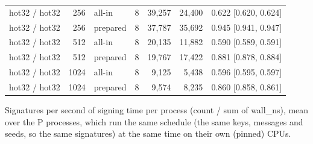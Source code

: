 \begin{table}[t]
{\begin{tabular}{lrlrrrl}
hot32 / hot32 & 256 & all-in & 8 & 39{,}257 & 24{,}400 & 0.622 [0.620, 0.624] \\
hot32 / hot32 & 256 & prepared & 8 & 37{,}787 & 35{,}692 & 0.945 [0.941, 0.947] \\
hot32 / hot32 & 512 & all-in & 8 & 20{,}135 & 11{,}882 & 0.590 [0.589, 0.591] \\
hot32 / hot32 & 512 & prepared & 8 & 19{,}767 & 17{,}422 & 0.881 [0.878, 0.884] \\
hot32 / hot32 & 1024 & all-in & 8 & 9{,}125 & 5{,}438 & 0.596 [0.595, 0.597] \\
hot32 / hot32 & 1024 & prepared & 8 & 9{,}574 & 8{,}235 & 0.860 [0.858, 0.861] \\
\bottomrule
\end{tabular}}
\par\smallskip\parbox{\linewidth}{\scriptsize Signatures per second of signing time per process (count / sum of wall\_ns), mean over the P processes, which run the same schedule (the same keys, messages and seeds, so the same signatures) at the same time on their own (pinned) CPUs.}
\end{table}


